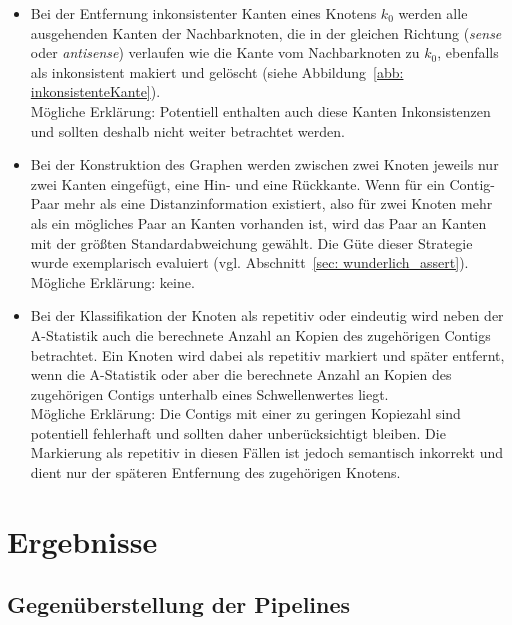 \documentclass[a4paper,11pt,parskip,abstract=on]{scrartcl}
\begin{document}
\begin{itemize}
\item Bei der Entfernung inkonsistenter Kanten eines Knotens $k_0$
  werden alle ausgehenden Kanten der Nachbarknoten, die in der gleichen
  Richtung (\textit{sense} oder \textit{antisense}) verlaufen wie die
  Kante vom Nachbarknoten zu $k_0$, ebenfalls als inkonsistent makiert
  und gelöscht (siehe Abbildung~\ref{abb: inkonsistenteKante}).\\
  Mögliche Erklärung: Potentiell enthalten auch diese Kanten
  Inkonsistenzen und sollten deshalb nicht weiter betrachtet werden.
\item Bei der Konstruktion des Graphen werden zwischen zwei Knoten
  jeweils nur zwei Kanten eingefügt, eine Hin- und eine Rückkante.
  Wenn für ein Contig-Paar mehr als eine Distanzinformation existiert,
  also für zwei Knoten mehr als ein mögliches Paar an Kanten vorhanden ist,
  wird das Paar an Kanten mit der größten Standardabweichung gewählt.
  Die Güte dieser Strategie wurde exemplarisch evaluiert
  (vgl. Abschnitt~\ref{sec: wunderlich_assert}).\\
  Mögliche Erklärung: keine.
\item Bei der Klassifikation der Knoten als repetitiv oder eindeutig
  wird neben der A-Statistik auch die berechnete Anzahl an
  Kopien des zugehörigen Contigs betrachtet. Ein Knoten wird
  dabei als repetitiv markiert und später entfernt, wenn die
  A-Statistik oder aber die berechnete Anzahl an Kopien des zugehörigen
  Contigs unterhalb eines Schwellenwertes liegt. \\
  Mögliche Erklärung: Die Contigs mit einer zu geringen
  Kopiezahl sind potentiell fehlerhaft und sollten daher unberücksichtigt
  bleiben. Die Markierung als repetitiv in diesen Fällen ist jedoch
  semantisch inkorrekt und dient nur der späteren Entfernung des
  zugehörigen Knotens.
\end{itemize}

\section{Ergebnisse}
\label{sec: Ergebnisse}
\subsection{Gegenüberstellung der Pipelines}
\end{document}
